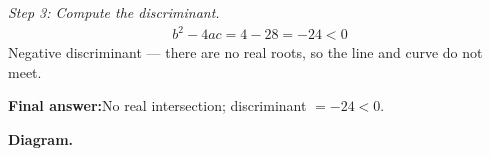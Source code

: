 \documentclass[11pt]{article}
\begin{document}
\textit{Step 3: Compute the discriminant.}
\[\begin{gathered}
b^2 - 4ac = 4 - 28 = -24 < 0
\end{gathered}\]
Negative discriminant --- there are no real roots, so the line and curve do not meet.

\begin{answerbox}
\textbf{Final answer:}\quad No real intersection; discriminant \(\displaystyle = -24 < 0\).
\end{answerbox}
\textbf{Diagram.}

\begin{center}
\end{center}
\end{document}
